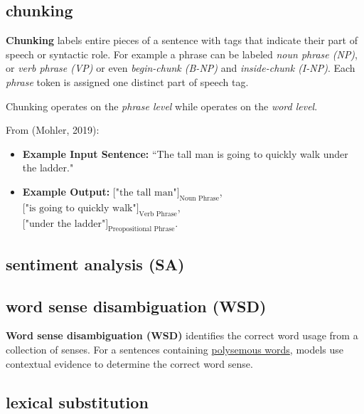 \subsection{chunking} \label{nlptask:chunking}

\textbf{Chunking} labels entire pieces of a sentence with tags that indicate their part of speech or syntactic role. For example a phrase can be labeled \emph{noun phrase (NP)}, or \emph{verb phrase (VP)} or even \emph{begin-chunk (B-NP)} and \emph{inside-chunk (I-NP)}. Each \emph{phrase} token is assigned one distinct part of speech tag. 

Chunking operates on the \emph{phrase level} while  operates on the \emph{word level}. 

From (Mohler, 2019): 
\begin{itemize}
    \item \textbf{Example Input Sentence: } ``The tall man is going to quickly walk under the ladder."
    
    \item \textbf{Example Output: } $\Big[ \text{"the tall man"}\Big]_\text{Noun Phrase}$, \ $\Big[ \text{"is going to quickly walk"}\Big]_\text{Verb Phrase}$, \\ $\Big[ \text{"under the ladder"}\Big]_\text{Preopositional Phrase}$.
\end{itemize}


\subsection{sentiment analysis (SA)} \label{nlptask:sentimentanalysisSA}




\subsection{word sense disambiguation (WSD)} \label{nlptask:wordsensedisambiguatioNWSD}

\textbf{Word sense disambiguation (WSD)} identifies the correct word usage from a collection of senses. For a sentences containing \hyperref[sec:Polysemy]{polysemous words}, models use contextual evidence to determine the correct word sense. 



\subsection{lexical substitution} \label{nlptask:lexicalsubstitution}

